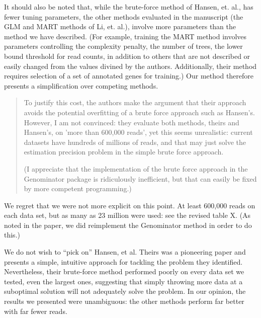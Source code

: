 \documentclass{article}
\begin{document}
It should also be noted that, while the brute-force method of Hansen, et. al.,
has fewer tuning parameters, the other methods evaluated in the manuscript (the
GLM and MART methods of Li, et. al.), involve more parameters than the method we
have described. (For example, training the MART method involves parameters
controlling the complexity penalty, the number of trees, the lower bound
threshold for read counts, in addition to others that are not described or
easily changed from the values divined by the authors.  Additionally, their
method requires selection of a set of annotated genes for training.)  Our method
therefore presents a simplification over competing methods.


\begin{quote}
To justify this cost, the
authors make the argument that their approach avoids the potential
overfitting of a brute force approach such as Hansen's. However, I am
not convinced: they evaluate both methods, theirs and Hansen's, on
'more than 600,000 reads', yet this seems unrealistic: current
datasets have hundreds of millions of reads, and that may just solve
the estimation precision problem in the simple brute force approach.

(I appreciate that the implementation of the brute force approach in
the Genominator package is ridiculously inefficient, but that can
easily be fixed by more competent programming.)
\end{quote}

We regret that we were not more explicit on this point. At least
600,000 reads on each data set, but as many as 23 million were used:
see the revised table X. (As noted in the paper, we did reimplement
the Genominator method in order to do this.)

We do not wish to ``pick on'' Hansen, et al.  Theirs was a pioneering
paper and presents a simple, intuitive approach for tackling the
problem they identified.  Nevertheless, their brute-force method
performed poorly on every data set we tested, even the largest ones,
suggesting that simply throwing more data at a suboptimal solution
will not adequately solve the problem.  In our opinion, the results we
presented were unambiguous: the other methods perform far better with
far fewer reads.

\end{document}
